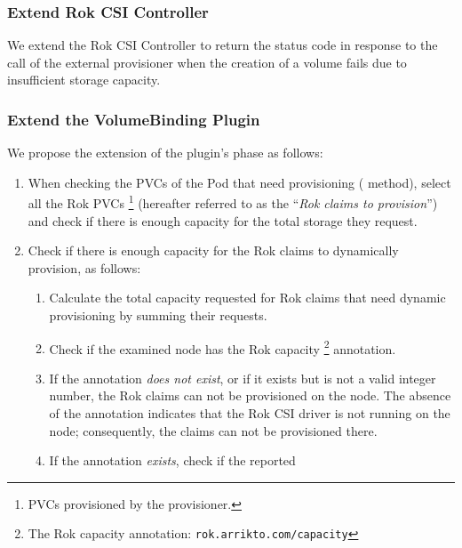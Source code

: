 \subsubsection{Extend Rok CSI Controller}
We extend the Rok CSI Controller to return the  status
code in response to the  call of the external provisioner when
the creation of a volume fails due to insufficient storage capacity.

\subsubsection{Extend the VolumeBinding Plugin}
\label{section:volume-plugin-extensions}

We propose the extension of the  plugin's  phase as
follows:
\begin{enumerate}
      \tightlist
      \item When checking the PVCs of the Pod that need provisioning
            ( method), select all the Rok PVCs
            \footnote{PVCs provisioned by the 
                  provisioner.} (hereafter referred to as the ``\textit{Rok
                  claims to provision}'') and check if there is enough capacity
            for the total storage they request.
      \item Check if there is enough capacity for the Rok claims to dynamically
            provision, as follows:
            \begin{enumerate}
                  \tightlist
                  \item Calculate the total capacity requested for Rok claims
                        that need dynamic provisioning by summing their
                        requests.
                  \item Check if the examined node has the Rok capacity
                        \footnote{The Rok capacity annotation:
                              \texttt{rok.arrikto.com/capacity}} annotation.
                  \item If the annotation \textit{does not exist}, or if it
                        exists but is not a valid integer number, the Rok claims
                        can not be provisioned on the node. The absence of the
                        annotation indicates that the Rok CSI driver is not
                        running on the node; consequently, the claims can not be
                        provisioned there.
                  \item If the annotation \textit{exists}, check if the reported

\end{enumerate}
\end{enumerate}
